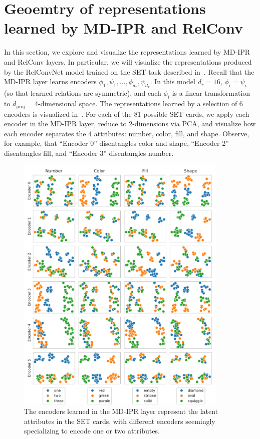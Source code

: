 \section{Geoemtry of representations learned by MD-IPR and RelConv}\label{sec:appendix_rep_analysis}

In this section, we explore and visualize the representations learned by MD-IPR and RelConv layers. In particular, we will visualize the representations produced by the RelConvNet model trained on the SET task described in~. Recall that the MD-IPR layer learns encoders $\phi_1, \psi_1, \ldots, \phi_{d_r}, \psi_{d_r}$. In this model $d_r = 16$, $\phi_i = \psi_i$ (so that learned relations are symmetric), and each $\phi_i$ is a linear transformation to $d_{\mathrm{proj}} = 4$-dimensional space. The representations learned by a selection of 6 encoders is visualized in~. For each of the 81 possible SET cards, we apply each encoder in the MD-IPR layer, reduce to 2-dimensions via PCA, and visualize how each encoder separates the 4 attributes: number, color, fill, and shape. Observe, for example, that ``Encoder 0'' disentangles color and shape, ``Encoder 2'' disentangles fill, and ``Encoder 3'' disentangles number.
\begin{figure}[!h]
    \centering
    \includegraphics[width=0.9\textwidth]{figs/representation_analysis/mdipr_encoders_rep.pdf}
    \caption{The encoders learned in the MD-IPR layer represent the latent attributes in the SET cards, with different encoders seemingly specializing to encode one or two attributes.}\label{fig:mdirp_encoders_rep}
\end{figure}

